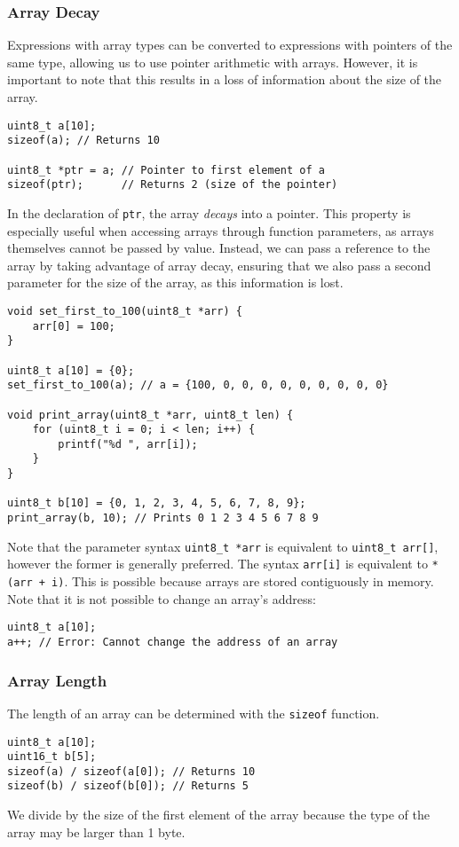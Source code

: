 \documentclass{article}
\begin{document}
\subsubsection{Array Decay}
Expressions with array types can be converted to expressions with
pointers of the same type, allowing us to use pointer arithmetic with
arrays. However, it is important to note that this results in a loss of
information about the size of the array.
\begin{verbatim}
uint8_t a[10];
sizeof(a); // Returns 10

uint8_t *ptr = a; // Pointer to first element of a
sizeof(ptr);      // Returns 2 (size of the pointer)
\end{verbatim}
In the declaration of \texttt{ptr}, the array \textit{decays}
into a pointer. This property is especially useful when accessing
arrays through function parameters, as arrays themselves cannot be
passed by value. Instead, we can pass a reference to the array by
taking advantage of array decay, ensuring that we also pass a second
parameter for the size of the array, as this information is lost.
\begin{verbatim}
void set_first_to_100(uint8_t *arr) {
    arr[0] = 100;
}

uint8_t a[10] = {0};
set_first_to_100(a); // a = {100, 0, 0, 0, 0, 0, 0, 0, 0, 0}

void print_array(uint8_t *arr, uint8_t len) {
    for (uint8_t i = 0; i < len; i++) {
        printf("%d ", arr[i]);
    }
}

uint8_t b[10] = {0, 1, 2, 3, 4, 5, 6, 7, 8, 9};
print_array(b, 10); // Prints 0 1 2 3 4 5 6 7 8 9
\end{verbatim}
Note that the parameter syntax \texttt{uint8_t *arr} is
equivalent to \texttt{uint8_t arr[]}, however the former is
generally preferred. The syntax \texttt{arr[i]} is
equivalent to \texttt{*(arr + i)}. This is possible because
arrays are stored contiguously in memory. Note that it is not possible
to change an array's address:
\begin{verbatim}
uint8_t a[10];
a++; // Error: Cannot change the address of an array
\end{verbatim}
\subsubsection{Array Length}
The length of an array can be determined with the
\texttt{sizeof} function.
\begin{verbatim}
uint8_t a[10];
uint16_t b[5];
sizeof(a) / sizeof(a[0]); // Returns 10
sizeof(b) / sizeof(b[0]); // Returns 5
\end{verbatim}
We divide by the size of the first element of the array because the
type of the array may be larger than 1 byte.
\end{document}

